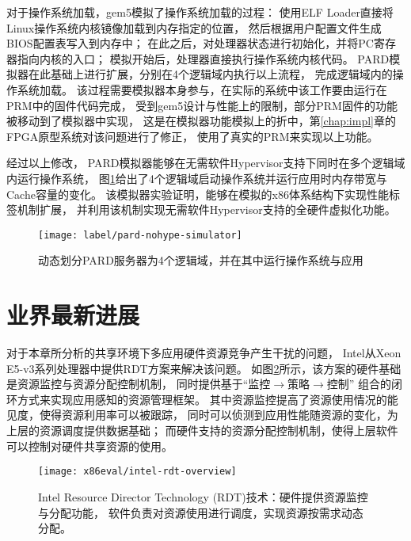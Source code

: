 对于操作系统加载，gem5模拟了操作系统加载的过程：
使用ELF Loader直接将Linux操作系统内核镜像加载到内存指定的位置，
然后根据用户配置文件生成BIOS配置表写入到内存中；
在此之后，对处理器状态进行初始化，并将PC寄存器指向内核的入口；
模拟开始后，处理器直接执行操作系统内核代码。
PARD模拟器在此基础上进行扩展，分别在4个逻辑域内执行以上流程，
完成逻辑域内的操作系统加载。
该过程需要模拟器本身参与，在实际的系统中该工作要由运行在PRM中的固件代码完成，
受到gem5设计与性能上的限制，部分PRM固件的功能被移动到了模拟器中实现，
这是在模拟器功能模拟上的折中，第\ref{chap:impl}章的FPGA原型系统对该问题进行了修正，
使用了真实的PRM来实现以上功能。

经过以上修改，
PARD模拟器能够在无需软件Hypervisor支持下同时在多个逻辑域内运行操作系统，
图\ref{fig:pard-nohype-simulator}给出了4个逻辑域启动操作系统并运行应用时内存带宽与Cache容量的变化。
该模拟器实验证明，能够在模拟的x86体系结构下实现性能标签机制扩展，
并利用该机制实现无需软件Hypervisor支持的全硬件虚拟化功能。

\begin{figure}[tb]
  \centering
  \texttt{[image: label/pard-nohype-simulator]}
  \caption{动态划分PARD服务器为4个逻辑域，并在其中运行操作系统与应用}
  \label{fig:pard-nohype-simulator}
\end{figure}


\section{业界最新进展}
\label{chap:labeladdrspace:intel-rdt}

对于本章所分析的共享环境下多应用硬件资源竞争产生干扰的问题，
Intel从Xeon E5-v3系列处理器中提供RDT\cite{intel-rdt}方案来解决该问题。
如图\ref{fig:intel-rdt-overview}所示，该方案的硬件基础是资源监控与资源分配控制机制，
同时提供基于``监控$\rightarrow$策略$\rightarrow$控制''
组合的闭环方式来实现应用感知的资源管理框架。
其中资源监控提高了资源使用情况的能见度，使得资源利用率可以被跟踪，
同时可以侦测到应用性能随资源的变化，为上层的资源调度提供数据基础；
而硬件支持的资源分配控制机制，使得上层软件可以控制对硬件共享资源的使用。

\begin{figure}[H]
  \centering
  \texttt{[image: x86eval/intel-rdt-overview]}
  \caption[Intel Resource Director Technology (RDT) 技术示意图]{
    Intel Resource Director Technology (RDT)技术：硬件提供资源监控与分配功能，
    软件负责对资源使用进行调度，实现资源按需求动态分配。}
  \label{fig:intel-rdt-overview}
\end{figure}

